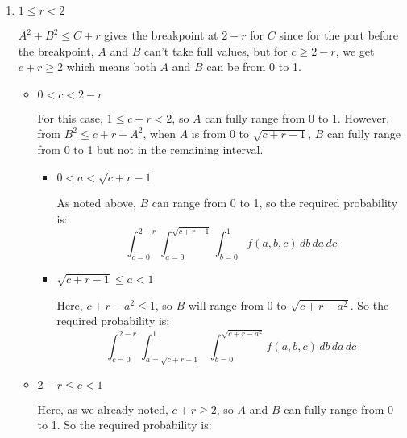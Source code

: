 \documentclass[12pt, oneside]{article}
\begin{document}
\begin{enumerate}
{\begin{enumerate}
        \item {
            \(1 \leq r < 2\)

            \(A^2 + B^2 \leq C + r\) gives the breakpoint at \(2 - r\) for \(C\) since
            for the part before the breakpoint, \(A\) and \(B\) can't take full values,
            but for \(c \geq 2 - r\), we get \(c + r \geq 2\) which means both \(A\) and \(B\)
            can be from 0 to 1.

            \begin{itemize}
                \item {
                    \(0 < c < 2 - r\)

                    For this case, \(1 \leq c + r < 2\), so \(A\) can fully range from
                    0 to 1. However, from \(B^2 \leq c + r - A^2\), when \(A\) is from 0 to
                    \(\sqrt{c + r - 1}\), \(B\) can fully range from 0 to 1 but not in the
                    remaining interval.

                    \begin{itemize}
                        \item {
                            \(0 < a < \sqrt{c + r - 1}\)

                            As noted above, \(B\) can range from 0 to 1, so the required probability
                            is:
                            \[
                                \int_{c = 0}^{2 - r} \int_{a=0}^{\sqrt{c + r - 1}} 
                                \int_{b = 0}^{1} f(a, b, c)\, db\, da\, dc
                            \]
                        }
                        \item {
                            \(\sqrt{c + r - 1} \leq a < 1\)

                            Here, \(c + r - a^2 \leq 1\), so \(B\) will range from 0 to
                            \(\sqrt{c + r - a^2}\). So the required probability is:
                            \[
                                \int_{c = 0}^{2 - r} \int_{a=\sqrt{c + r - 1}}^{1} 
                                \int_{b = 0}^{\sqrt{c + r - a^2}} f(a, b, c)\, db\, da\, dc
                            \]
                        }
                    \end{itemize}
                }
                \item {
                    \(2 - r \leq c < 1\)

                    Here, as we already noted, \(c + r \geq 2\), so \(A\) and \(B\) can fully
                    range from 0 to 1. So the required probability is:

}
\end{itemize}}
\end{enumerate}}
\end{enumerate}
\end{document}
